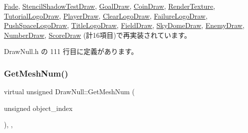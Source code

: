 \mbox{\hyperlink{class_fade_a6aed6912ebf9c243c52cb82f298d8d64}{Fade}}, \mbox{\hyperlink{class_stencil_shadow_test_draw_adfa99798c61ac13f209dc99f1e2694c5}{Stencil\+Shadow\+Test\+Draw}}, \mbox{\hyperlink{class_goal_draw_a50fa9ceaaecdff9910e0f91e65ad9e95}{Goal\+Draw}}, \mbox{\hyperlink{class_coin_draw_a8f5fd8668a4c66fe31446cc6f7c4afd7}{Coin\+Draw}}, \mbox{\hyperlink{class_render_texture_a0e9746f5cebdd088f2303e18cbc52eae}{Render\+Texture}}, \mbox{\hyperlink{class_tutorial_logo_draw_ab700e592d00574dff6ee342138343d7b}{Tutorial\+Logo\+Draw}}, \mbox{\hyperlink{class_player_draw_a8edf1441ea23f298c6a0ca707f54021a}{Player\+Draw}}, \mbox{\hyperlink{class_clear_logo_draw_af5d12b717020101e5c956cf3574f0e2a}{Clear\+Logo\+Draw}}, \mbox{\hyperlink{class_failure_logo_draw_aefc4be9e6ead4d90a5fc9c22cc07fe92}{Failure\+Logo\+Draw}}, \mbox{\hyperlink{class_push_space_logo_draw_a1ab6229ba2d68b730797f5016c99f359}{Push\+Space\+Logo\+Draw}}, \mbox{\hyperlink{class_title_logo_draw_af21cd1dbd79c741a2e3ca2b8e26c5f61}{Title\+Logo\+Draw}}, \mbox{\hyperlink{class_field_draw_a2629b4c4cd8e240e39c65b879c6e82b6}{Field\+Draw}}, \mbox{\hyperlink{class_sky_dome_draw_ab947a3d43975a6d95149bc112c08ce05}{Sky\+Dome\+Draw}}, \mbox{\hyperlink{class_enemy_draw_a6f2a052a45caf0d255112cbe81b8bfa3}{Enemy\+Draw}}, \mbox{\hyperlink{class_number_draw_a78f50afa05e728811d89a491f5eec899}{Number\+Draw}}, \mbox{\hyperlink{class_score_draw_a62aa20ef4b40544bf0a95770b925c780}{Score\+Draw}} (計16項目)で再実装されています。



 Draw\+Null.\+h の 111 行目に定義があります。

\mbox{\label{class_draw_null_ad735978a85a5f3583eecd82d6bfe6413}} 
\subsubsection{\texorpdfstring{Get\+Mesh\+Num()}{GetMeshNum()}}
{\footnotesize\ttfamily virtual unsigned Draw\+Null\+::\+Get\+Mesh\+Num (\begin{DoxyParamCaption}\item[{unsigned}]{object\+\_\+index }\end{DoxyParamCaption})\hspace{0.3cm}{\ttfamily [inline]}, {\ttfamily [override]}, {\ttfamily [virtual]}}



